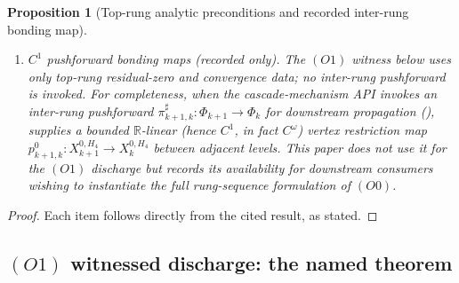 \documentclass[11pt]{article}
\newcommand{\R}{\mathbb{R}}
\newtheorem{proposition}[theorem]{Proposition}
\theoremstyle{definition}
\begin{document}
\begin{proposition}[Top-rung analytic preconditions and recorded
inter-rung bonding map]
\begin{enumerate}[label=\textup{(O0.\arabic*)}, leftmargin=3em]
\item \emph{$C^{1}$ pushforward bonding maps (recorded only).} The
  $(O1)$ witness below uses only top-rung residual-zero and
  convergence data; no inter-rung pushforward is invoked. For
  completeness, when the cascade-mechanism API invokes an
  inter-rung pushforward $\pi^{\sharp}_{k+1, k} \colon \Phi_{k+1}
  \to \Phi_k$ for downstream propagation
  (\cite[\S 3.4 lines 600--605]{CascadeMechanism}),
  \cite[Definition~\texttt{def:p0}, Theorem~\texttt{thm:bonding}]
  {RefinementSpaces} supplies a bounded $\R$-linear (hence $C^{1}$,
  in fact $C^{\omega}$) vertex restriction map
  $p_{k+1, k}^{0} \colon X_{k+1}^{0, H_4} \to X_k^{0, H_4}$
  between adjacent levels. This paper does not use it for the
  $(O1)$ discharge but records its availability for downstream
  consumers wishing to instantiate the full rung-sequence
  formulation of $(O0)$.
\end{enumerate}
\end{proposition}

\begin{proof}
Each item follows directly from the cited result, as stated.
\end{proof}

\subsection{$(O1)$ witnessed discharge: the named theorem}
\end{document}
